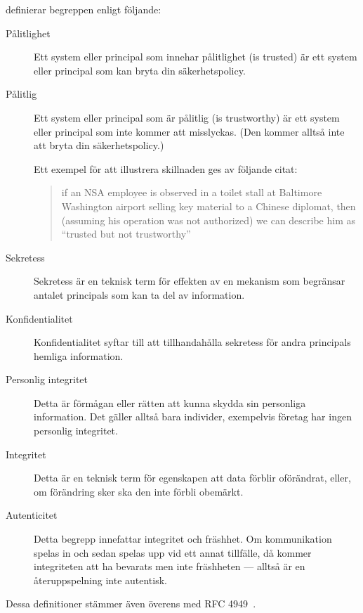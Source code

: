   \begin{solution}
    \citet[ss.\ 13--14]{Anderson2008sea} definierar begreppen enligt följande:
    \begin{description}
      \item[Pålitlighet] Ett system eller principal som innehar pålitlighet 
        (\foreignlanguage{english}{is trusted}) är ett system eller principal 
        som kan bryta din säkerhetspolicy.

      \item[Pålitlig] Ett system eller principal som är pålitlig 
        (\foreignlanguage{english}{is trustworthy}) är ett system eller 
        principal som inte kommer att misslyckas.
        (Den kommer alltså inte att bryta din säkerhetspolicy.)

        Ett exempel för att illustrera skillnaden ges av följande citat: 
        \blockcquote[s.\ 13]{Anderson2008sea}{%
          if an NSA employee is observed in a toilet stall at Baltimore 
          Washington airport selling key material to a Chinese diplomat, then 
          (assuming his operation was not authorized) we can describe him as 
          \enquote{trusted but not trustworthy}%
        }.

      \item[Sekretess] Sekretess är en teknisk term för effekten av en mekanism 
        som begränsar antalet principals som kan ta del av information.

      \item[Konfidentialitet] Konfidentialitet syftar till att tillhandahålla 
        sekretess för andra principals hemliga information.

      \item[Personlig integritet] Detta är förmågan eller rätten att kunna 
        skydda sin personliga information.
        Det gäller alltså bara individer, exempelvis företag har ingen 
        personlig integritet.

      \item[Integritet] Detta är en teknisk term för egenskapen att data 
        förblir oförändrat, eller, om förändring sker ska den inte förbli 
        obemärkt.

      \item[Autenticitet] Detta begrepp innefattar integritet och fräshhet.
        Om kommunikation spelas in och sedan spelas upp vid ett annat 
        tillfälle, då kommer integriteten att ha bevarats men inte fräshheten 
        --- alltså är en återuppspelning inte autentisk.
    \end{description}
    Dessa definitioner stämmer även överens med RFC 4949~\cite{rfc4949}.
  \end{solution}


